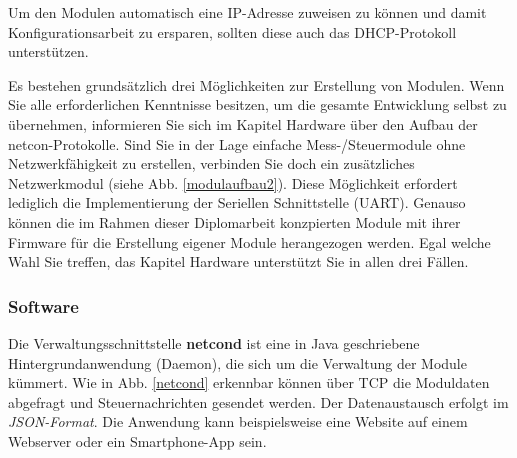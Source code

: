 \documentclass[a4paper,14pt,headsepline]{scrartcl}
\begin{document}
Um den Modulen automatisch eine IP-Adresse zuweisen zu können und damit Konfigurationsarbeit zu ersparen, sollten diese auch das DHCP-Protokoll unterstützen.

Es bestehen grundsätzlich drei Möglichkeiten zur Erstellung von Modulen. Wenn Sie alle erforderlichen Kenntnisse besitzen, um die gesamte Entwicklung selbst zu übernehmen, informieren Sie sich im Kapitel Hardware über den Aufbau der netcon-Protokolle. Sind Sie in der Lage einfache Mess-/Steuermodule ohne Netzwerkfähigkeit zu erstellen, verbinden Sie doch ein zusätzliches Netzwerkmodul (siehe Abb. \ref{modulaufbau2}). Diese Möglichkeit erfordert lediglich die Implementierung der Seriellen Schnittstelle (UART). Genauso können die im Rahmen dieser Diplomarbeit konzpierten Module mit ihrer Firmware für die Erstellung eigener Module herangezogen werden. Egal welche Wahl Sie treffen, das Kapitel Hardware unterstützt Sie in allen drei Fällen.

\begin{figure}[h]
\begin{center}
\end{center}
\end{figure}

\newpage

\subsubsection{Software}
Die Verwaltungsschnittstelle \textbf{netcond} ist eine in Java geschriebene Hintergrundanwendung (Daemon), die sich um die Verwaltung der Module kümmert. Wie in Abb. \ref{netcond} erkennbar können über TCP die Moduldaten abgefragt und Steuernachrichten gesendet werden. Der Datenaustausch erfolgt im \textit{JSON-Format}. Die Anwendung kann beispielsweise eine Website auf einem Webserver oder ein Smartphone-App sein. 
\end{document}
